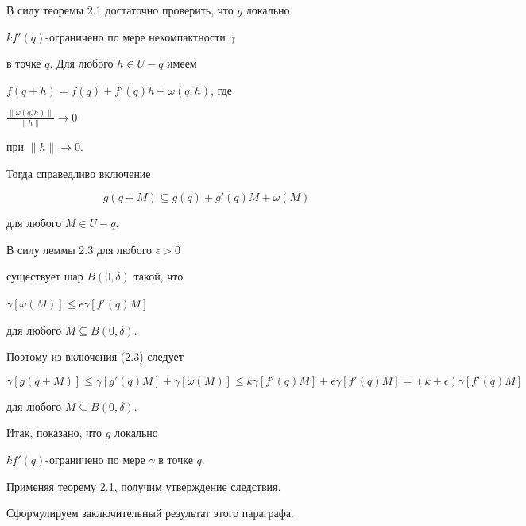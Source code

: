 \begin{pf}


В силу теоремы 2.1 достаточно проверить, что $g$ локально 


$k f'(q)$-огра\-ни\-че\-но по мере некомпактности $\gamma$


в точке $q$. Для любого $h \in U - q$ имеем 


$f(q+h) = f(q) + f' (q) h + \omega (q,h)$, где


$\frac{\|\omega (q,h)\|}{\| h \|} \to 0$


при $\| h \| \to 0$.


Тогда справедливо включение


\begin{equation}


g (q+M) \subseteq g(q) + g' (q) M + \omega (M)


\end{equation}


для любого $M \in U - q$.


В силу леммы 2.3 для любого $\epsilon > 0$


существует шар $B(0,\delta)$ такой, что 


$\gamma [\omega (M)] \leq \epsilon \gamma [f' (q) M]$


для любого $M \subseteq B(0,\delta)$.


Поэтому из включения (2.3) следует


$$


\gamma [g (q + M)] \leq \gamma [g' (q) M] + \gamma [\omega (M)] \leq 


k \gamma [f' (q) M] +  \epsilon \gamma [f' (q) M] = 


(k+\epsilon) \gamma [f' (q) M]


$$


для любого $M \subseteq B(0,\delta)$.


Итак, показано, что $g$ локально 


$k f' (q)$-ограничено по мере $\gamma$ в точке $q$.


Применяя теорему 2.1, получим утверждение следствия.


\end{pf}





Сформулируем заключительный результат этого параграфа.






